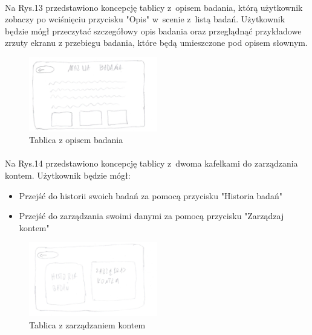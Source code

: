 \documentclass[12pt, letterpaper]{article}
\begin{document}
\newapge
		
\paragraph{}
Na Rys.13 przedstawiono koncepcję tablicy z~opisem badania, którą użytkownik zobaczy po wciśnięciu przycisku "Opis" w~scenie z~listą badań. Użytkownik będzie mógł przeczytać szczegółowy opis badania oraz przeglądnąć przykładowe zrzuty ekranu z przebiegu badania, które będą umieszczone pod opisem słownym.
		
\begin{figure}[h]
  \centering
      \includegraphics[width=0.5\textwidth]{GUI_opis_badania}
  \caption{Tablica z opisem badania}
\end{figure}

\newapge
		
\paragraph{}
Na Rys.14 przedstawiono koncepcję tablicy z~dwoma kafelkami do zarządzania kontem. Użytkownik będzie mógł:
		
		\begin{itemize}
			\item Przejść do historii swoich badań za pomocą przycisku "Historia badań"
			\item Przejść do zarządzania swoimi danymi za pomocą przycisku "Zarządzaj kontem"
		\end{itemize}

		
\begin{figure}[h]
  \centering
      \includegraphics[width=0.5\textwidth]{GUI_zarzadzanie_kontem}
  \caption{Tablica z zarządzaniem kontem}
\end{figure}
\end{document}
